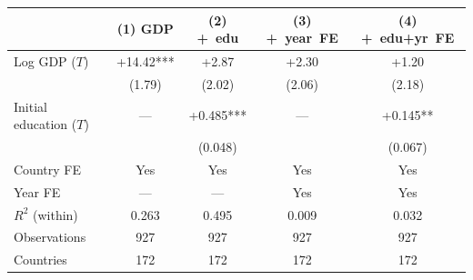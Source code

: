 \documentclass[12pt,letterpaper]{article}
\begin{document}
{\small\setlength{\tabcolsep}{4pt}
\begin{longtable}[]{@{}lcccc@{}}
\toprule
                          & (1) GDP & (2) +~edu & (3) +~year~FE & (4) +~edu+yr~FE \\
\midrule
\endhead
Log GDP ($T$)             & +14.42*** & +2.87\hphantom{***}    & +2.30\hphantom{***}    & +1.20\hphantom{***}    \\
                          & (1.79)    & (2.02)    & (2.06)    & (2.18)    \\
Initial education ($T$)   & ---       & +0.485*** & ---       & +0.145**  \\
                          &           & (0.048)   &           & (0.067)   \\
\midrule
Country FE                & Yes       & Yes       & Yes       & Yes       \\
Year FE                   & ---       & ---       & Yes       & Yes       \\
$R^2$ (within)            & 0.263     & 0.495     & 0.009     & 0.032     \\
Observations              & 927       & 927       & 927       & 927       \\
Countries                 & 172       & 172       & 172       & 172       \\
\bottomrule
\end{longtable}}
\end{document}
